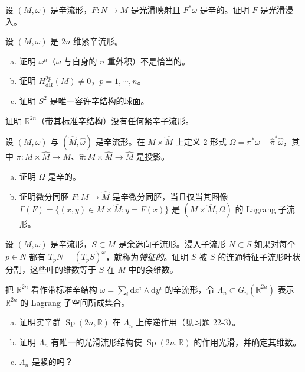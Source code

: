 \documentclass[../../main.tex]{subfiles}
\begin{document}
\begin{exercise}\label{exercise:ch22-p22-04}
设 $(M,\omega)$ 是辛流形，$F:N\to M$ 是光滑映射且 $F^*\omega$ 是辛的。证明 $F$ 是光滑浸入。
\end{exercise}

\begin{exercise}\label{exercise:ch22-p22-05}
设 $(M,\omega)$ 是 $2n$ 维紧辛流形。
\begin{enumerate}[(a)]
\item 证明 $\omega^n$（$\omega$ 与自身的 $n$ 重外积）不是恰当的。
\item 证明 $H^{2p}_{\mathrm{dR}}(M)\neq0$，$p=1,\cdots ,n$。
\item 证明 $S^2$ 是唯一容许辛结构的球面。
\end{enumerate}
\end{exercise}

\begin{exercise}\label{exercise:ch22-p22-06}
证明 $\mathbb{R}^{2n}$（带其标准辛结构）没有任何紧辛子流形。
\end{exercise}

\begin{exercise}\label{exercise:ch22-p22-07}
设 $(M,\omega)$ 与 $(\widehat M,\widehat\omega)$ 是辛流形。在 $M\times\widehat M$ 上定义 $2$-形式 $\Omega=\pi^*\omega-\widehat\pi^*\widehat\omega$，其中 $\pi:M\times\widehat M\to M$、$\widehat\pi:M\times\widehat M\to\widehat M$ 是投影。
\begin{enumerate}[(a)]
\item 证明 $\Omega$ 是辛的。
\item 证明微分同胚 $F:M\to\widehat M$ 是辛微分同胚，当且仅当其图像 $\Gamma(F)=\{(x,y)\in M\times\widehat M:y=F(x)\}$ 是 $(M\times\widehat M,\Omega)$ 的 Lagrang 子流形。
\end{enumerate}
\end{exercise}

\begin{exercise}\label{exercise:ch22-p22-08}
设 $(M,\omega)$ 是辛流形，$S\subset M$ 是余迷向子流形。浸入子流形 $N\subset S$ 如果对每个 $p\in N$ 都有 $T_pN=(T_pS)^\omega$，就称为\emph{特征的}。证明 $S$ 被 $S$ 的连通特征子流形叶状分割，这些叶的维数等于 $S$ 在 $M$ 中的余维数。
\end{exercise}

\begin{exercise}\label{exercise:ch22-p22-09}
把 $\mathbb{R}^{2n}$ 看作带标准辛结构 $\omega=\sum_i\mathrm{d}x^i\wedge\mathrm{d}y^i$ 的辛流形，令 $\Lambda_n\subset G_n(\mathbb{R}^{2n})$ 表示 $\mathbb{R}^{2n}$ 的 Lagrang 子空间所成集合。
\begin{enumerate}[(a)]
\item 证明实辛群 $\operatorname{Sp}(2n,\mathbb R)$ 在 $\Lambda_n$ 上传递作用（见习题 22-3）。
\item 证明 $\Lambda_n$ 有唯一的光滑流形结构使 $\operatorname{Sp}(2n,\mathbb R)$ 的作用光滑，并确定其维数。
\item $\Lambda_n$ 是紧的吗？
\end{enumerate}
\end{exercise}
\end{document}
